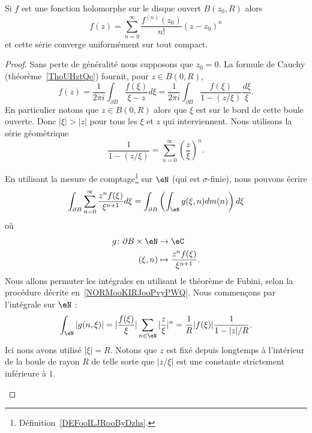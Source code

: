 \begin{theorem}     \label{THOooSULFooHTLRPE}
	Si \( f\) est une fonction holomorphe sur le disque ouvert \( B(z_0,R)\) alors
	\begin{equation}
		f(z)=\sum_{n=0}^{\infty}\frac{ f^{(n)}(z_0) }{ n! }(z-z_0)^n
	\end{equation}
	et cette série converge uniformément sur tout compact.
\end{theorem}

\begin{proof}
	Sans perte de généralité nous supposons que \( z_0=0\). La formule de Cauchy (théorème~\ref{ThoUHztQe}) fournit, pour \( z\in B(0,R)\),
	\begin{equation}
		f(z)=\frac{1}{ 2\pi i }\int_{\partial B}\frac{ f(\xi) }{ \xi-z }d\xi=\frac{1}{ 2\pi i }\int_{\partial B}\frac{ f(\xi) }{ 1-(z/\xi) }\frac{ d\xi }{ \xi }.
	\end{equation}
	En particulier notons que \( z\in B(0,R)\) alors que \( \xi\) est sur le bord de cette boule ouverte. Donc \( | \xi |>| z |\) pour tous les \( \xi\) et \( z\) qui interviennent. Nous utilisons la série géométrique
	\begin{equation}
		\frac{1}{ 1-(z/\xi) }=\sum_{n=0}^{\infty}\left( \frac{ z }{ \xi } \right)^n.
	\end{equation}

	\begin{subproof}
		En utilisant la mesure de comptage\footnote{Définition~\ref{DEFooILJRooByDzhs}.} sur \( \eN\) (qui est \( \sigma\)-finie), nous pouvons écrire
		\begin{equation}        \label{EQooWOLOooFHSrsx}
			\int_{\partial B}\sum_{n=0}^{\infty}\frac{ z^nf(\xi) }{ \xi^{n+1} }d\xi= \int_{\partial B}\left( \int_{\eN}g(\xi,n)dm(n) \right)d\xi
		\end{equation}
		où \begin{equation}
			\begin{aligned}
				g\colon \partial B\times \eN & \to \eC                                  \\
				(\xi,n)                      & \mapsto \frac{ z^nf(\xi) }{ \xi^{n+1} }.
			\end{aligned}
		\end{equation}
		Nous allons permuter les intégrales en utilisant le théorème de Fubini, selon la procédure décrite en~\ref{NORMooKIRJooPvyPWQ}. Nous commençons par l'intégrale sur \( \eN\) :
		\begin{equation}        \label{EQooLQLOooKiSAKH}
			\int_{\eN}| g(n,\xi) |=| \frac{ f(\xi) }{ \xi } |\sum_{n\in \eN}| \frac{ z }{ \xi } |^n=\frac{1}{ R }| f(\xi) |\frac{1}{ 1-| z |/R }.
		\end{equation}
		Ici nous avons utilisé \( | \xi |=R\). Notons que \( z\) est fixé depuis longtemps à l'intérieur de la boule de rayon \( R\) de telle sorte que \( | z/\xi |\) est une constante strictement inférieure à \( 1\).


\end{subproof}
\end{proof}
